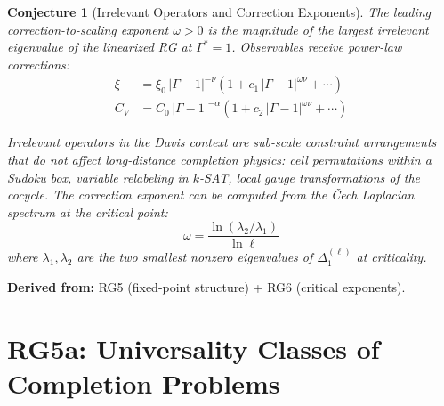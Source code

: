 \documentclass[11pt,letterpaper]{article}
\newtheorem{conjecture}{Conjecture}[section]
\begin{document}
\begin{conjecture}[Irrelevant Operators and Correction 
Exponents]\label{conj:corrections}
The leading \emph{correction-to-scaling exponent} $\omega > 0$ is 
the magnitude of the largest irrelevant eigenvalue of the 
linearized RG at $\Gamma^* = 1$. Observables receive power-law 
corrections:
\begin{align}
    \xi &= \xi_0 \, |\Gamma - 1|^{-\nu} 
    \left(1 + c_1 \, |\Gamma - 1|^{\omega \nu} + \cdots\right)
    \label{eq:xi_correction}\\
    C_V &= C_0 \, |\Gamma - 1|^{-\alpha} 
    \left(1 + c_2 \, |\Gamma - 1|^{\omega \nu} + \cdots\right)
    \label{eq:cv_correction}
\end{align}

Irrelevant operators in the Davis context are sub-scale constraint 
arrangements that do not affect long-distance completion physics: 
cell permutations within a Sudoku box, variable relabeling in 
$k$-SAT, local gauge transformations of the cocycle. The 
correction exponent can be computed from the \v{C}ech Laplacian 
spectrum at the critical point:
\begin{equation}\label{eq:omega_spectral}
    \omega = \frac{\ln(\lambda_2 / \lambda_1)}{\ln \ell}
\end{equation}
where $\lambda_1, \lambda_2$ are the two smallest nonzero 
eigenvalues of $\Delta_1^{(\ell)}$ at criticality.
\end{conjecture}

\textbf{Derived from:} RG5 (fixed-point structure) + RG6 (critical 
exponents).

\section{RG5a: Universality Classes of Completion Problems}
\end{document}

